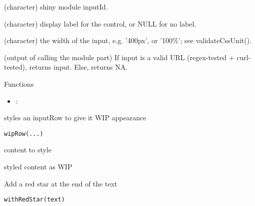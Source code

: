 \documentclass[letterpaper]{book}
\begin{document}
%
\begin{Arguments}
\begin{ldescription}
\item[\code{id}] (character) shiny module inputId.

\item[\code{label}] (character) display label for the control, or NULL for no label.

\item[\code{width}] (character) the width of the input, e.g. '400px', or '100\%'; see
validateCssUnit().
\end{ldescription}
\end{Arguments}
%
\begin{Value}
(output of calling the module part)
If input is a valid URL (regex-tested + curl-tested), returns input.
Else, returns NA.
\end{Value}
%
\begin{Section}{Functions}
\begin{itemize}

\item{} : 

\end{itemize}
\end{Section}
%
\begin{Description}\relax
styles an inputRow to give it WIP appearance
\end{Description}
%
\begin{Usage}
\begin{verbatim}
wipRow(...)
\end{verbatim}
\end{Usage}
%
\begin{Arguments}
\begin{ldescription}
\item[\code{...}] content to style
\end{ldescription}
\end{Arguments}
%
\begin{Value}
styled content as WIP
\end{Value}
%
\begin{Description}\relax
Add a red star at the end of the text
\end{Description}
%
\begin{Usage}
\begin{verbatim}
withRedStar(text)
\end{verbatim}
\end{Usage}
\end{document}
